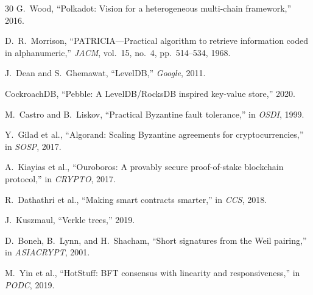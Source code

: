 \begin{thebibliography}{30}
G.~Wood, ``Polkadot: Vision for a heterogeneous multi-chain framework,'' 2016.

D.~R.~Morrison, ``PATRICIA---Practical algorithm to retrieve information coded in alphanumeric,'' \emph{JACM}, vol.~15, no.~4, pp.~514--534, 1968.

J.~Dean and S.~Ghemawat, ``LevelDB,'' \emph{Google}, 2011.

CockroachDB, ``Pebble: A LevelDB/RocksDB inspired key-value store,'' 2020.

M.~Castro and B.~Liskov, ``Practical Byzantine fault tolerance,'' in \emph{OSDI}, 1999.

Y.~Gilad et al., ``Algorand: Scaling Byzantine agreements for cryptocurrencies,'' in \emph{SOSP}, 2017.

A.~Kiayias et al., ``Ouroboros: A provably secure proof-of-stake blockchain protocol,'' in \emph{CRYPTO}, 2017.

R.~Dathathri et al., ``Making smart contracts smarter,'' in \emph{CCS}, 2018.

J.~Kuszmaul, ``Verkle trees,'' 2019.

D.~Boneh, B.~Lynn, and H.~Shacham, ``Short signatures from the Weil pairing,'' in \emph{ASIACRYPT}, 2001.

M.~Yin et al., ``HotStuff: BFT consensus with linearity and responsiveness,'' in \emph{PODC}, 2019.

\end{thebibliography}

